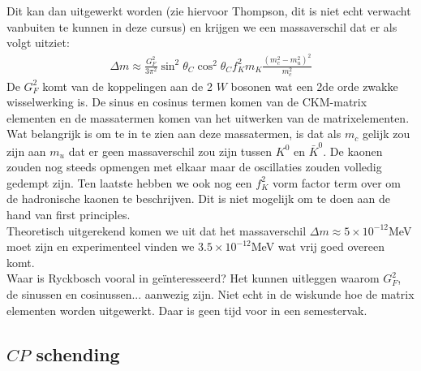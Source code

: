 \documentclass[../main.tex]{subfiles}
\begin{document}
Dit kan dan uitgewerkt worden (zie hiervoor Thompson, dit is niet echt verwacht vanbuiten te kunnen in deze cursus) en krijgen we een massaverschil dat er als volgt uitziet:
\begin{equation}
    \begin{aligned}
        \label{eq:kaon_osc_massaverschil}
        \Delta m \approx \frac{G_{F}^{2}}{3 \pi^{2}} \sin ^{2} \theta_{C} \cos ^{2} \theta_{C} f_{K}^{2} m_{K} \frac{\left(m_{c}^{2}-m_{u}^{2}\right)^{2}}{m_{c}^{2}}
    \end{aligned}
\end{equation}
De $G_F^2$ komt van de koppelingen aan de 2 $W$ bosonen wat een 2de orde zwakke wisselwerking is. De sinus en cosinus termen komen van de CKM-matrix elementen en de massatermen komen van het uitwerken van de matrixelementen. Wat belangrijk is om te in te zien aan deze massatermen, is dat als $m_c$ gelijk zou zijn aan $m_u$ dat er geen massaverschil zou zijn tussen $K^0$ en $\bar{K}^0$. De kaonen zouden nog steeds opmengen met elkaar maar de oscillaties zouden volledig gedempt zijn. Ten laatste hebben we ook nog een $f_K^2$ vorm factor term over om de hadronische kaonen te beschrijven. Dit is niet mogelijk om te doen aan de hand van first principles.\\
Theoretisch uitgerekend komen we uit dat het massaverschil $\Delta m \approx 5 \times 10^{-12}$MeV moet zijn en experimenteel vinden we $3.5 \times 10^{-12}$MeV wat vrij goed overeen komt.\\
{\color{red} Waar is Ryckbosch vooral in geïnteresseerd? Het kunnen uitleggen waarom $G_F^2$, de sinussen en cosinussen... aanwezig zijn. Niet echt in de wiskunde hoe de matrix elementen worden uitgewerkt. Daar is geen tijd voor in een semestervak.}\\

\subsection{$CP$ schending}%
\label{sub:_cp_schending}
\end{document}

